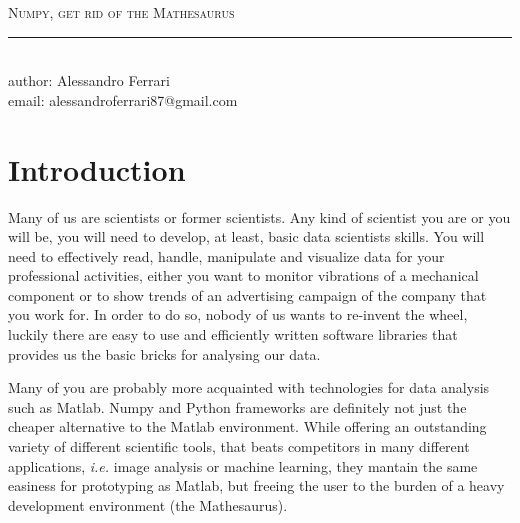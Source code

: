 \documentclass[aps,letterpaper,10pt]{revtex4}
\makeatletter
\newcommand{\labtitle}{Numpy, get rid of the Mathesaurus}
\newcommand{\authorname}{Alessandro Ferrari}
\newcommand{\emailauthor}{alessandroferrari87@gmail.com}
\makeatother
\begin{document}



\begin{titlepage}
\begin{center}
{\Large \textsc{\labtitle} \\ \vspace{4pt}} 
\rule[13pt]{\textwidth}{1pt} \\ \vspace{150pt}
{\large author: \authorname \\ \vspace{10pt}
email: \emailauthor \\ \vspace{10pt}}
\end{center}
\end{titlepage}

\section{Introduction}
Many of us are scientists or former scientists. Any kind of scientist you are or you will be, you will need to develop, at least, basic data scientists skills. You will need to effectively read, handle, manipulate and visualize data for your professional activities, either you want to monitor vibrations of a mechanical component or to show trends of an advertising campaign of the company that you work for. In order to do so, nobody of us wants to re-invent the wheel, luckily there are easy to use and efficiently written software libraries that provides us the basic bricks for analysing our data.\vspace{3mm}

Many of you are probably more acquainted with technologies for data analysis such as Matlab. Numpy and Python frameworks are definitely not just the cheaper alternative to the Matlab environment. While offering an outstanding variety of different scientific tools, that beats competitors in many different applications, \textit{i.e.} image analysis or machine learning, they mantain the same easiness for prototyping as Matlab, but freeing the user to the burden of a heavy development environment (the Mathesaurus).\vspace{3mm} 
\end{document}
